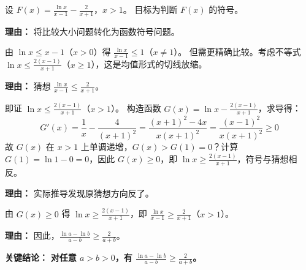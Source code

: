 \begin{examplebox}
\begin{description}[style=nextline, leftmargin=2.8em, labelsep=0.5em, itemsep=0.45em]
    \item[\textbf{第二步（作差构造函数）：}] 设 $F(x) = \frac{\ln x}{x-1} - \frac{2}{x+1}$，$x>1$。
    目标为判断 $F(x)$ 的符号。
    \par\textbf{理由：}
    将比较大小问题转化为函数符号问题。

    \item[\textbf{第三步（利用切线不等式）：}] 由 $\ln x \leq x-1$（$x>0$）得 $\frac{\ln x}{x-1} \leq 1$（$x\neq1$）。
    但需更精确比较。考虑不等式 $\ln x \leq \frac{2(x-1)}{x+1}$（$x\geq1$），这是均值形式的切线放缩。
    \par\textbf{理由：}
    猜想 $\frac{\ln x}{x-1} \leq \frac{2}{x+1}$。

    \item[\textbf{第四步（证明猜想）：}] 即证 $\ln x \leq \frac{2(x-1)}{x+1}$（$x>1$）。
    构造函数 $G(x) = \ln x - \frac{2(x-1)}{x+1}$，求导得：
    \[
    G'(x) = \frac{1}{x} - \frac{4}{(x+1)^2} = \frac{(x+1)^2 - 4x}{x(x+1)^2} = \frac{(x-1)^2}{x(x+1)^2} \geq 0
    \]
    故 $G(x)$ 在 $x>1$ 上单调递增，$G(x) > G(1)=0$？计算 $G(1)=\ln 1 - 0=0$，因此 $G(x) \geq 0$，即 $\ln x \geq \frac{2(x-1)}{x+1}$，符号与猜想相反。
    \par\textbf{理由：}
    实际推导发现原猜想方向反了。

    \item[\textbf{第五步（调整方向）：}] 由 $G(x) \geq 0$ 得 $\ln x \geq \frac{2(x-1)}{x+1}$，即 $\frac{\ln x}{x-1} \geq \frac{2}{x+1}$（$x>1$）。
    \par\textbf{理由：}
    因此，$\frac{\ln a - \ln b}{a-b} \geq \frac{2}{a+b}$。
\end{description}

\textbf{\textcolor{CExample}{关键结论：}} \textbf{对任意 $a>b>0$，有 $\frac{\ln a - \ln b}{a-b} \geq \frac{2}{a+b}$。}
\end{examplebox}
